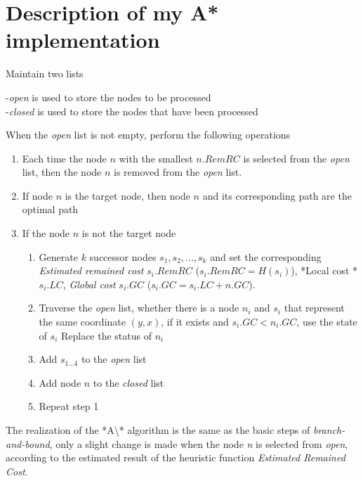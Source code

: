\documentclass[
]{article}
\begin{document}
\section{Description of my A* implementation}

Maintain two lists

-\emph{open} is used to store the nodes to be processed\\
-\emph{closed} is used to store the nodes that have been processed

When the \emph{open} list is not empty, perform the following operations

\begin{enumerate}
\def\labelenumi{\arabic{enumi}.}
\item
  Each time the node \(n\) with the smallest \(n.RemRC\) is selected
  from the \emph{open} list, then the node \(n\) is removed from the
  \emph{open} list.
\item
  If node \(n\) is the target node, then node \(n\) and its
  corresponding path are the optimal path
\item
  If the node \(n\) is not the target node

  \begin{enumerate}
  \def\labelenumii{\arabic{enumii}.}
  \item
    Generate \(k\) successor nodes \(s_1, s_2, ..., s_k\) and set the
    corresponding \emph{Estimated remained cost} \(s_i.RemRC\)
    (\(s_i.RemRC = H(s_i)\)), *Local cost * \(s_i.LC\), \emph{Global
    cost} \(s_i.GC\) (\(s_i.GC = s_i.LC + n.GC\)).
  \item
    Traverse the \emph{open} list, whether there is a node \(n_i\) and
    \(s_i\) that represent the same coordinate \((y, x)\), if it exists
    and \(s_i.GC <n_i.GC\), use the state of \(s_i\) Replace the status
    of \(n_i\)
  \item
    Add \(s_{1...4}\) to the \emph{open} list
  \item
    Add node \(n\) to the \emph{closed} list
  \item
    Repeat step 1
  \end{enumerate}
\end{enumerate}

The realization of the *A\textbackslash** algorithm is the same as the
basic steps of \emph{branch-and-bound}, only a slight change is made
when the node \emph{n} is selected from \emph{open}, according to the
estimated result of the heuristic function \emph{Estimated Remained
Cost}.
\end{document}
